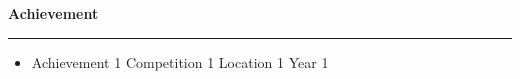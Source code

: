 

\textbf{Achievement}

\par\noindent\rule{\textwidth}{0.2pt}

\begin{itemize}
    \item {{Achievement 1} %
            {Competition 1} %
            {Location 1} %
            {Year 1}} %
\end{itemize}
